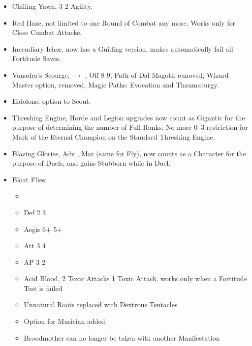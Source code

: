 \begin{itemize}
\item Chilling Yawn, \minuss{}3 \baddown{} \minuss{}2 Agility.
\item Red Haze, not limited to one Round of Combat any more. Works only for Close Combat Attacks.
\item Incendiary Ichor, now has a Guiding version, makes automatically fail all Fortitude Saves.
\item Vanadra's Scourge,  $\rightarrow$ , Off 8 \goodup{} 9, Path of Dal Magoth removed, Wizard Master option, removed, Magic Paths: Evocation and Thaumaturgy.
\item Eidolons, option to Scout.
\item Threshing Engine, Horde and Legion upgrades now count as Gigantic for the purpose of determining the number of Full Ranks. No more 0--3 restriction for Mark of the Eternal Champion on the Standard Threshing Engine.
\item Blazing Glories, Adv  \goodup{} , Mar  \goodup{}  (same for Fly), now counts as a Character for the purpose of Duels, and gains Stubborn while in Duel.
\item Bloat Flies:
\begin{itemize}
\item {} \baddown{} 
\item Def 2 \goodup{} 3
\item Aegis 6+ \goodup{} 5+
\item Att 3 \goodup{} 4
\item AP 3 \baddown{} 2
\item Acid Blood, 2 Toxic Attacks \baddown{} 1 Toxic Attack, works only when a Fortitude Test is failed
\item Unnatural Roots replaced with Dextrous Tentacles
\item Option for Musician added
\item Broodmother can no longer be taken with another Manifestation
\end{itemize}
\end{itemize}

\subtitle{Balance changes}

